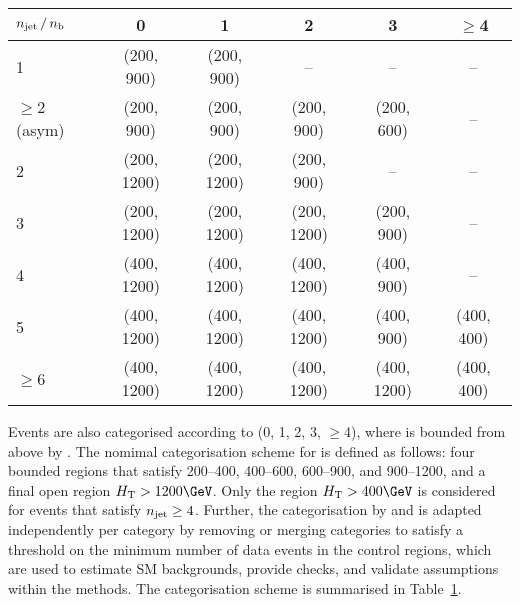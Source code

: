 \begin{table}[!tb]
  \newcommand{\ph}{\phantom{1}}
  \label{tab:categorisation}
  \centering
  \begin{tabular}{ lccccc }
    \hline
    $n_{\mathrm{jet}}\, / \,n_{\mathrm{b}}$ & 0             & 1             & 2             & 3             & $\geq$4    \\
    \hline
    1                 & (200, \ph900) & (200, \ph900) & --            & --            & --         \\ 
    $\geq$2 (asym)    & (200, \ph900) & (200, \ph900) & (200, \ph900) & (200, \ph600) & --         \\ 
    2                 & (200, 1200)   & (200, 1200)   & (200, \ph900) & --            & --         \\ 
    3                 & (200, 1200)   & (200, 1200)   & (200, 1200)   & (200, \ph900) & --         \\ 
    4                 & (400, 1200)   & (400, 1200)   & (400, 1200)   & (400, \ph900) & --         \\ 
    5                 & (400, 1200)   & (400, 1200)   & (400, 1200)   & (400, \ph900) & (400, 400) \\ 
    $\geq$6           & (400, 1200)   & (400, 1200)   & (400, 1200)   & (400, 1200)   & (400, 400) \\ 
    \hline
  \end{tabular}
\end{table}

Events are also categorised according to \nb (0, 1, 2, 3, $\geq$4),
where \nb is bounded from above by \njet. The nomimal categorisation
scheme for \scalht is defined as follows: four bounded regions that
satisfy 200--400, 400--600, 600--900, and 900--1200\GeV, and a final
open region $\scalht > 1200\GeV$. Only the region $\scalht > 400\GeV$
is considered for events that satisfy $n_{\mathrm{jet}} \geq 4$. Further, the
categorisation by \nb and \scalht is adapted independently per \njet
category by removing or merging categories to satisfy a threshold on
the minimum number of data events in the control regions, which are
used to estimate SM backgrounds, provide checks, and validate
assumptions within the methods. The categorisation scheme is
summarised in Table~\ref{tab:categorisation}.


